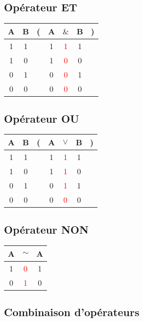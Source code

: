\documentclass[12pt,a4paper]{article}
\begin{document}
	\subsection{Opérateur \textbf{ET}}
	
	\begin{tabular}{@{ }c@{ }@{ }c | c@{}@{ }c@{ }@{ }c@{ }@{ }c@{ }@{}c@{ }}
		A & B & ( & A & $\&$ & B & )\\
		\hline 
		1 & 1 &  & 1 & \textcolor{red}{1} & 1 & \\
		1 & 0 &  & 1 & \textcolor{red}{0} & 0 & \\
		0 & 1 &  & 0 & \textcolor{red}{0} & 1 & \\
		0 & 0 &  & 0 & \textcolor{red}{0} & 0 & \\
	\end{tabular}

	\subsection{Opérateur \textbf{OU}}
	
	\begin{tabular}{@{ }c@{ }@{ }c | c@{}@{ }c@{ }@{ }c@{ }@{ }c@{ }@{}c@{ }}
		A & B & ( & A & $\lor$ & B & )\\
		\hline 
		1 & 1 &  & 1 & \textcolor{red}{1} & 1 & \\
		1 & 0 &  & 1 & \textcolor{red}{1} & 0 & \\
		0 & 1 &  & 0 & \textcolor{red}{1} & 1 & \\
		0 & 0 &  & 0 & \textcolor{red}{0} & 0 & \\
	\end{tabular}

	\subsection{Opérateur \textbf{NON}}
	
	\begin{small}
		\begin{tabular}{@{ }c | c@{ }@{ }c}
		A & $\sim$ & A\\
		\hline 
		1 & \textcolor{red}{0} & 1\\
		0 & \textcolor{red}{1} & 0\\
	\end{tabular}
	\end{small}

	\subsection{Combinaison d'opérateurs}
	
\end{document}
